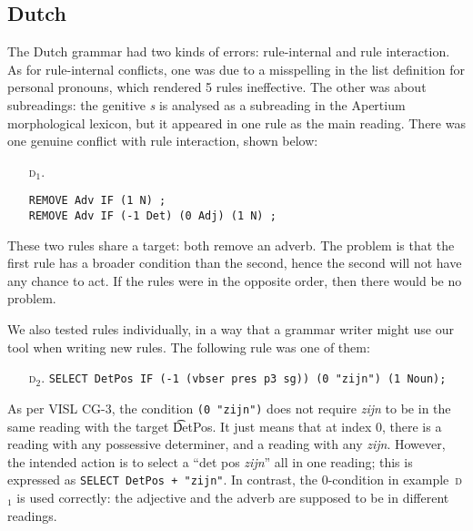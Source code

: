 {{\subsection{Dutch} The Dutch grammar had two kinds of errors: rule-internal and rule interaction. As for rule-internal conflicts, one was due to a misspelling in the list definition for personal pronouns, which rendered 5 rules ineffective. The other was about subreadings: the genitive \emph{s} is analysed as a subreading in the Apertium morphological lexicon, but it appeared in one rule as the main reading. 
There was one genuine conflict with rule interaction, shown below:

\begin{itemize}
\item[\textsc{d$_1$.}] 
\begin{verbatim}REMOVE Adv IF (1 N) ;
REMOVE Adv IF (-1 Det) (0 Adj) (1 N) ;
\end{verbatim}
\end{itemize}

\noindent These two rules share a target: both remove an adverb.
The problem is that the first rule has a broader condition than the second, hence the second will not have any chance to act. 
If the rules were in the opposite order, then there would be no problem.



We also tested rules individually, in a way that a grammar writer might use our tool when writing new rules.
The following rule was one of them:

\begin{itemize}
\item[\textsc{d$_2$.}] 
\texttt{SELECT DetPos IF (-1 (vbser pres p3 sg)) (0 "zijn") (1 Noun);}
\end{itemize} 

\noindent As per VISL CG-3, the condition \texttt{(0 "zijn")} does not require
 \emph{zijn} to be in the same reading with the target \t{DetPos}.
It just means that at index 0,
there is a reading with any possessive determiner, and a reading with any \emph{zijn}.
However, the intended action is to select a ``det pos \emph{zijn}'' all in one reading;
this is expressed as \texttt{SELECT DetPos + "zijn"}.
In contrast, the 0-condition in example~\textsc{d$_1$} is used correctly:
the adjective and the adverb are supposed to be in different readings.


}}
